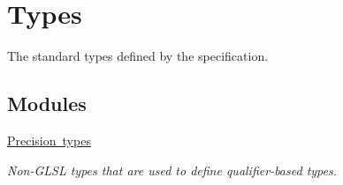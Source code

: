 \hypertarget{group__core__types}{}\section{Types}
\label{group__core__types}


The standard types defined by the specification.  


\subsection*{Modules}
\begin{DoxyCompactItemize}
\item 
\mbox{\hyperlink{group__core__precision}{Precision types}}
\begin{DoxyCompactList}\small\item\em Non-\/\+G\+L\+SL types that are used to define qualifier-\/based types. \end{DoxyCompactList}\end{DoxyCompactItemize}
